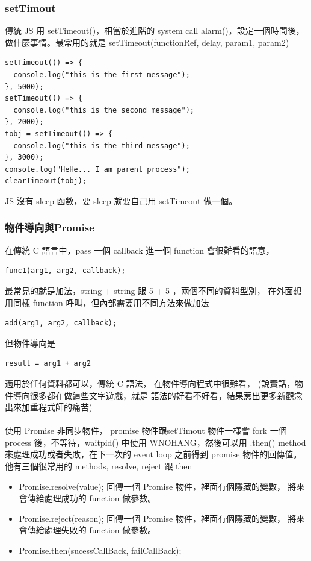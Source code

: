   \subsubsection{setTimout}
  傳統 JS 用 setTimeout()，相當於進階的 system call alarm()，設定一個時間後，
  做什麼事情。最常用的就是 setTimeout(functionRef, delay, param1, param2)
  \begin{verbatim}
setTimeout(() => {
  console.log("this is the first message");
}, 5000);
setTimeout(() => {
  console.log("this is the second message");
}, 2000);
tobj = setTimeout(() => {
  console.log("this is the third message");
}, 3000);
console.log("HeHe... I am parent process");
clearTimeout(tobj);
  \end{verbatim}
  JS 沒有 sleep 函數，要 sleep 就要自己用 setTimeout 做一個。
  \subsubsection{物件導向與Promise}
  在傳統 C 語言中，pass 一個 callback 進一個 function 會很難看的語意，
  \begin{verbatim}
func1(arg1, arg2, callback);
  \end{verbatim}
  最常見的就是加法，string + string 跟  5 + 5 ，兩個不同的資料型別，
  在外面想用同樣 function 呼叫，但內部需要用不同方法來做加法
  \begin{verbatim}
add(arg1, arg2, callback);
  \end{verbatim}
  但物件導向是
  \begin{verbatim}
result = arg1 + arg2
  \end{verbatim}
  適用於任何資料都可以，傳統 C 語法， 在物件導向程式中很難看，
  (說實話，物件導向很多都在做這些文字遊戲，就是
  語法的好看不好看，結果惹出更多新觀念出來加重程式師的痛苦)
  \\\\
  使用 Promise 非同步物件， promise 物件跟setTimout 物件一樣會 fork 一個
  process 後，不等待，waitpid() 中使用 WNOHANG，然後可以用 .then() method
  來處理成功或者失敗，在下一次的 event loop 之前得到 promise 物件的回傳值。
  他有三個很常用的 methods, resolve, reject 跟 then
  \begin{itemize}
    \item Promise.resolve(value); 回傳一個 Promise 物件，裡面有個隱藏的變數，
      將來會傳給處理成功的 function 做參數。
    \item Promise.reject(reason); 回傳一個 Promise 物件，裡面有個隱藏的變數，
      將來會傳給處理失敗的 function 做參數。
    \item Promise.then(sucessCallBack, failCallBack);
  \end{itemize}
